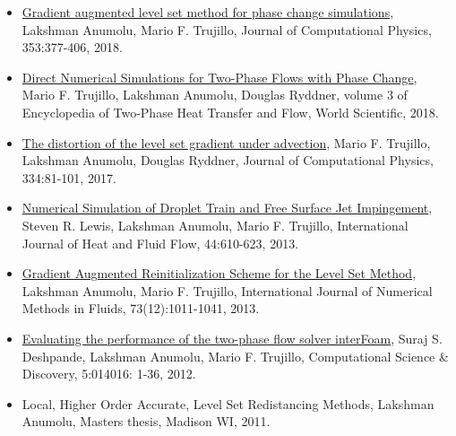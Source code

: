 \documentclass{res}
\begin{document}
\begin{resume}
\begin{itemize}[leftmargin=\parindent]
	\item[] \href{https://www.sciencedirect.com/science/article/pii/S0021999117307696}{Gradient augmented level set method for phase change simulations}, Lakshman Anumolu, Mario F. Trujillo, Journal of Computational Physics, 353:377-406, 2018.
	\item[] \href{https://www.worldscientific.com/doi/abs/10.1142/9789813229440_0008}{Direct Numerical Simulations for Two-Phase Flows with Phase Change}, Mario F. Trujillo, Lakshman Anumolu, Douglas Ryddner, volume 3 of Encyclopedia of Two-Phase Heat Transfer and Flow, World Scientific, 2018.
	\item[] \href{https://www.sciencedirect.com/science/article/pii/S0021999116307045}{The distortion of the level set gradient under advection}, Mario F. Trujillo, Lakshman Anumolu, Douglas Ryddner, Journal of Computational Physics, 334:81-101, 2017.
	\item[] \href{https://www.sciencedirect.com/science/article/pii/S0142727X13001707}{Numerical Simulation of Droplet Train and Free Surface Jet Impingement}, Steven R. Lewis, Lakshman Anumolu, Mario F. Trujillo, International Journal of Heat and Fluid Flow, 44:610-623, 2013.
	\item[] \href{http://onlinelibrary.wiley.com/doi/10.1002/fld.3834/abstract}{Gradient Augmented Reinitialization Scheme for the Level Set Method}, Lakshman Anumolu, Mario F. Trujillo, International Journal of Numerical Methods in Fluids, 73(12):1011-1041, 2013.
	\item[] \href{http://iopscience.iop.org/1749-4699/5/1/014016}{Evaluating the performance of the two-phase flow solver interFoam}, Suraj S. Deshpande, Lakshman Anumolu, Mario F. Trujillo, Computational Science \& Discovery, 5:014016: 1-36, 2012.
	\item[] Local, Higher Order Accurate, Level Set Redistancing Methods, Lakshman Anumolu, Masters thesis, Madison WI, 2011.
	\end{itemize}
	
	
	

\end{resume}
\end{document}
